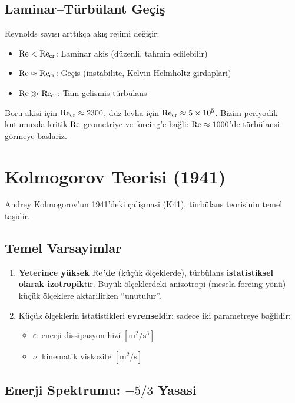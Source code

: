 \subsection{Laminar--Türbülant Geçiş}

Reynolds sayısı arttıkça akış rejimi değişir:
\begin{itemize}
\item $\mathrm{Re} < \mathrm{Re}_{\text{cr}}$: Laminar akis (düzenli, tahmin edilebilir)
\item $\mathrm{Re} \approx \mathrm{Re}_{\text{cr}}$: Geçis (instabilite, Kelvin-Helmholtz girdaplari)
\item $\mathrm{Re} \gg \mathrm{Re}_{\text{cr}}$: Tam gelismis türbülans
\end{itemize}

Boru akisi için $\mathrm{Re}_{\text{cr}} \approx 2300$, düz levha için $\mathrm{Re}_{\text{cr}} \approx 5\times10^5$.
Bizim periyodik kutumuzda kritik $\mathrm{Re}$ geometriye ve forcing'e bağli: $\mathrm{Re} \approx 1000$'de türbülansi görmeye baslariz.


\section{Kolmogorov Teorisi (1941)}
\label{sec:kolmogorov}

Andrey Kolmogorov'un 1941'deki çalişmasi (K41), türbülans teorisinin temel taşidir.

\subsection{Temel Varsayimlar}

\begin{enumerate}
\item \textbf{Yeterince yüksek $\mathrm{Re}$'de} (küçük ölçeklerde), türbülans \textbf{istatistiksel olarak izotropik}tir. Büyük ölçeklerdeki anizotropi (mesela forcing yönü) küçük ölçeklere aktarilirken ``unutulur''.
\item Küçük ölçeklerin istatistikleri \textbf{evrensel}dir: sadece iki parametreye bağlidir:
\begin{itemize}
\item $\varepsilon$: enerji dissipasyon hizi $[\text{m}^2/\text{s}^3]$
\item $\nu$: kinematik viskozite $[\text{m}^2/\text{s}]$
\end{itemize}
\end{enumerate}

\subsection{Enerji Spektrumu: $-5/3$ Yasasi}
\label{subsec:energy_spectrum}


